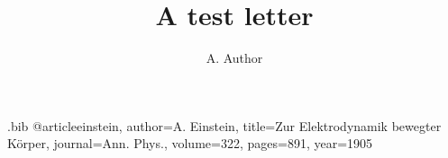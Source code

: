 \begin{filecontents*}[overwrite]{\jobname.bib}
@article{einstein, author={A. Einstein}, title={Zur Elektrodynamik bewegter K{\"o}rper},
  journal={Ann. Phys.}, volume={322}, pages={891}, year={1905}}
\end{filecontents*}
\documentclass[aps,prl,twocolumn,superscriptaddress]{revtex4-2}
\usepackage{amsmath,bm}

\title{A test letter}
\author{A. Author}
\begin{abstract}
A short abstract.
\end{abstract}
\maketitle
Special relativity~\cite{einstein} gives
\begin{equation}
  E^2 = (pc)^2 + (mc^2)^2, \qquad {} = .
\end{equation}


